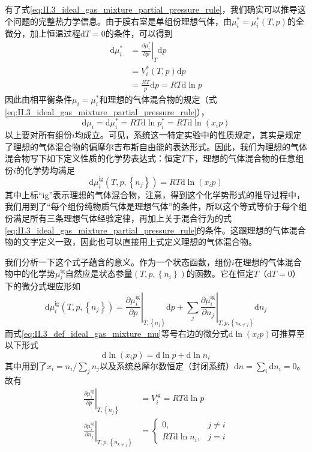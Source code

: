 \documentclass[main.tex]{subfiles}
\begin{document}
有了式\eqref{eq:II.3_ideal_gas_mixture_partial_pressure_rule}，我们确实可以推导这个问题的完整热力学信息。由于膜右室是单组份理想气体，由$\mu_i^*=\mu_i^*\left(T,p\right)$的全微分，加上恒温过程$\mathrm{d}T=0$的条件，可以得到
\begin{align*}
  \mathrm{d}\mu_i^* & =\left.\frac{\partial\mu_i^*}{\partial p}\right|_{T}\mathrm{d}p \\
                    & =V_i^*\left(T,p\right)\mathrm{d}p                               \\
                    & =\frac{RT}{p}\mathrm{d}p=RT\mathrm{d}\ln p
\end{align*}
因此由相平衡条件$\mu_i=\mu_i^*$和理想的气体混合物的规定（式\eqref{eq:II.3_ideal_gas_mixture_partial_pressure_rule}），
\[\mathrm{d}\mu_i=\mathrm{d}\mu_i^*=RT\mathrm{d}\ln p_i^*=RT\mathrm{d}\ln\left(x_ip\right)\]
以上要对所有组份$i$均成立。可见，系统这一特定实验中的性质规定，其实是规定了理想的气体混合物的偏摩尔吉布斯自由能的表达形式。因此，我们为理想的气体混合物写下如下定义性质的化学势表达式：恒定$T$下，理想的气体混合物的任意组份$i$的化学势均满足
\begin{equation}\label{eq:II.3_def_ideal_gas_mixture_mu}
  \mathrm{d}\mu_i^\text{ig}\left(T,p,\left\{n_j\right\}\right)=RT\mathrm{d}\ln\left(x_i p\right)
\end{equation}
其中上标“ig”表示理想的气体混合物，注意，得到这个化学势形式的推导过程中，我们用到了“每个组份纯物质气体是理想气体”的条件，所以这个等式等价于每个组份满足所有三条理想气体经验定律，再加上关于混合行为的式\eqref{eq:II.3_ideal_gas_mixture_partial_pressure_rule}的条件。这跟理想的气体混合物的文字定义一致，因此也可以直接用上式定义理想的气体混合物。

我们分析一下这个式子蕴含的意义。作为一个状态函数，组份$i$在理想的气体混合物中的化学势$\mu_i^\text{ig}$自然应是状态参量$\left(T,p,\left\{n_i\right\}\right)$的函数。它在恒定$T$（$\mathrm{d}T=0$）下的微分式理应形如
\[\mathrm{d}\mu_i^\text{ig}\left(T,p,\left\{n_j\right\}\right)=\left.\frac{\partial \mu_i^\text{ig}}{\partial p}\right|_{T,\left\{n_j\right\}}\mathrm{d}p+\sum_j\left.\frac{\partial\mu_i^\text{ig}}{\partial n_j}\right|_{T,p,\left\{n_{k\neq j}\right\}}\mathrm{d}n_j\]
而式\eqref{eq:II.3_def_ideal_gas_mixture_mu}等号右边的微分式$\mathrm{d}\ln\left(x_ip\right)$可推算至以下形式
\[\mathrm{d}\ln\left(x_ip\right)=\mathrm{d}\ln p+\mathrm{d}\ln n_i\]
其中用到了$x_i=n_i/\sum_jn_j$以及系统总摩尔数恒定（封闭系统）$\mathrm{d}n=\sum_i\mathrm{d}n_i=0$。故有
\begin{align*}
  \left.\frac{\partial \mu_i^\text{ig}}{\partial p}\right|_{T,\left\{n_j\right\}}             & =V_i^\text{ig}=RT\mathrm{d}\ln p                                                \\
  \left.\frac{\partial \mu_i^\text{ig}}{\partial n_j}\right|_{T,p,\left\{n_{k\neq j}\right\}} & =\left\{\begin{array}{ll}0,&j\neq i\\RT\mathrm{d}\ln n_i,&j=i\end{array}\right.
\end{align*}
\end{document}
